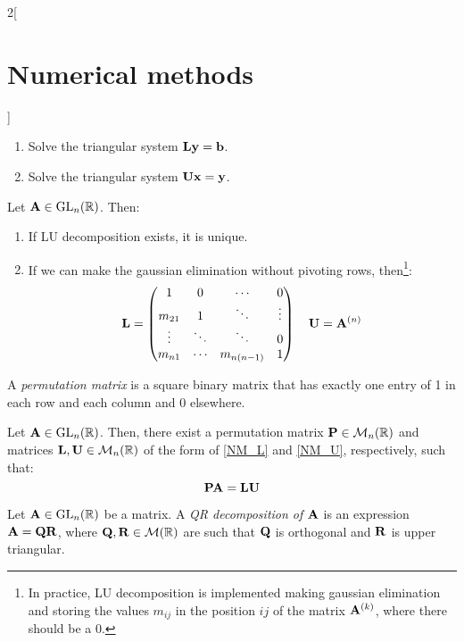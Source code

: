 \documentclass[../../../main.tex]{subfiles}
\begin{document}
\begin{multicols}{2}[\section{Numerical methods}]
\begin{lemma}
    \begin{enumerate}
        \item Solve the triangular system $\vb{L}\vb{y}=\vb{b}$.
        \item Solve the triangular system $\vb{U}\vb{x}=\vb{y}$.
    \end{enumerate}
\end{lemma}
\begin{prop}
    Let $\vb{A}\in\mathrm{GL}_n(\mathbb{R})$. Then:
    \begin{enumerate}
        \item If LU decomposition exists, it is unique.
        \item If we can make the gaussian elimination without pivoting rows, then\footnote{In practice, LU decomposition is implemented making gaussian elimination and storing the values $m_{ij}$ in the position $ij$ of the matrix $\vb{A}^{(k)}$, where there should be a 0.}:
        $$
        \vb{L}=
        \begin{pmatrix}
            1 & 0 & \cdots & 0\\
            m_{21} & 1 & \ddots & \vdots \\
            \vdots & \ddots & \ddots & 0\\
            m_{n1} & \cdots & m_{n(n-1)} & 1
        \end{pmatrix}\quad
        \vb{U}=\vb{A}^{(n)}
        $$
    \end{enumerate}
\end{prop}
\begin{definition}
    A \textit{permutation matrix} is a square binary matrix that has exactly one entry of 1 in each row and each column and 0 elsewhere. 
\end{definition}
\begin{prop}
    Let $\vb{A}\in\mathrm{GL}_n(\mathbb{R})$. Then, there exist a permutation matrix $\vb{P}\in\mathcal{M}_n(\mathbb{R})$ and matrices $\vb{L},\vb{U}\in\mathcal{M}_n(\mathbb{R})$ of the form of \eqref{NM_L} and \eqref{NM_U}, respectively, such that: $$\vb{P}\vb{A}=\vb{L}\vb{U}$$
\end{prop}
\begin{definition}[QR descompostion]
    Let $\vb{A}\in\mathrm{GL}_n(\mathbb{R})$ be a matrix. A \textit{QR decomposition of $\vb{A}$} is an expression $\vb{A}=\vb{Q}\vb{R}$, where $\vb{Q},\vb{R}\in\mathcal{M}(\mathbb{R})$ are such that $\vb{Q}$ is orthogonal and $\vb{R}$ is upper triangular.

\end{definition}
\end{multicols}
\end{document}
